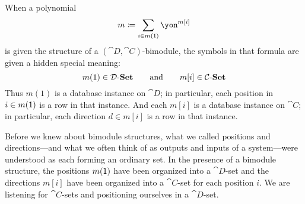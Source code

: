 \documentclass[DynamicalBook]{subfiles}
\begin{document}
When a polynomial
\[
m\coloneqq\sum_{i\in m(\1)}\yon^{m[i]}
\]
is given the structure of a $(\cat{D},\cat{C})$-bimodule, the symbols in that formula are given a hidden special meaning:
\[
  m(\textsf{1})\in\mathcal{D}\textnormal{-}\textbf{Set}
  \qquad\text{and}\qquad
	m[i]\in\mathcal{C}\textnormal{-}\textbf{Set}
\]
Thus $m(1)$ is a database instance on $\cat{D}$; in particular, each position in $i\in m(\textsf{1})$ is a row in that instance. And each $m[i]$ is a database instance on $\cat{C}$; in particular, each direction $d\in m[i]$ is a row in that instance.

Before we knew about bimodule structures, what we called positions and directions---and what we often think of as outputs and inputs of a system---were understood as each forming an ordinary set. In the presence of a bimodule structure, the positions $m(\textsf{1})$ have been organized into a $\cat{D}$-set and the directions $m[i]$ have been organized into a $\cat{C}$-set for each position $i$. We are listening for $\cat{C}$-sets and positioning ourselves in a $\cat{D}$-set.
\end{document}
